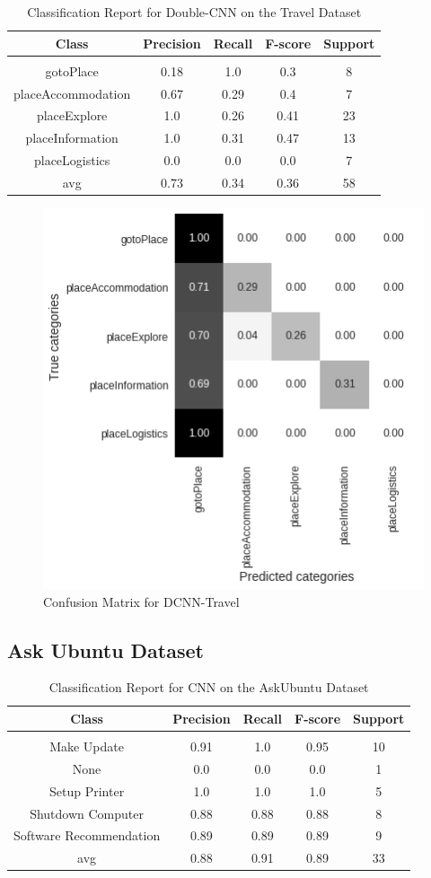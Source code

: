 \documentclass[11pt, oneside]{article}   	%
\begin{document}
\newpage
\begin{table}[h]
\centering
\caption{Classification Report for Double-CNN on the Travel Dataset}
\begin{tabular}{c | c c c c}
Class & Precision & Recall & F-score & Support\\
\hline
\hline\\
gotoPlace & 0.18 & 1.0 & 0.3 & 8\\
placeAccommodation & 0.67 & 0.29 & 0.4 & 7\\
placeExplore & 1.0 & 0.26 & 0.41 & 23\\
placeInformation & 1.0 & 0.31 & 0.47 & 13\\
placeLogistics & 0.0 & 0.0 & 0.0 & 7\\
avg & 0.73 & 0.34 & 0.36 & 58\\
\end{tabular}
\end{table}

\begin{figure}[h]
\centering
\includegraphics[width=0.6\linewidth]{DCNN-Travel}
\caption{Confusion Matrix for DCNN-Travel}
\label{fig:DCNN-Travel}
\end{figure}



\newpage
\subsection{Ask Ubuntu Dataset}

\begin{table}[h]
\centering
\caption{Classification Report for CNN on the AskUbuntu Dataset}
\begin{tabular}{c | c c c c}
Class & Precision & Recall & F-score & Support\\
\hline
\hline\\
Make Update & 0.91 & 1.0 & 0.95 & 10\\
None & 0.0 & 0.0 & 0.0 & 1\\
Setup Printer & 1.0 & 1.0 & 1.0 & 5\\
Shutdown Computer & 0.88 & 0.88 & 0.88 & 8\\
Software Recommendation & 0.89 & 0.89 & 0.89 & 9\\
avg & 0.88 & 0.91 & 0.89 & 33\\
\end{tabular}
\end{table}
\end{document}

